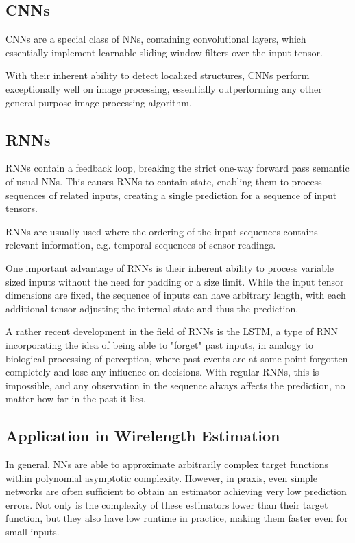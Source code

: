 \subsection{\glspl{CNN}}

\glspl{CNN} are a special class of \glspl{NN}, containing convolutional layers, which essentially implement learnable sliding-window filters over the input tensor. 

With their inherent ability to detect localized structures, \glspl{CNN} perform exceptionally well on image processing, essentially outperforming any other general-purpose image processing algorithm.\cite{TODO}

\subsection{\glspl{RNN}}

\glspl{RNN} contain a feedback loop, breaking the strict one-way forward pass semantic of usual \glspl{NN}. This causes \glspl{RNN} to contain state, enabling them to process sequences of related inputs, creating a single prediction for a sequence of input tensors.

\glspl{RNN} are usually used where the ordering of the input sequences contains relevant information, e.g. temporal sequences of sensor readings.

One important advantage of \glspl{RNN} is their inherent ability to process variable sized inputs without the need for padding or a size limit. While the input tensor dimensions are fixed, the sequence of inputs can have arbitrary length, with each additional tensor adjusting the internal state and thus the prediction.

A rather recent development in the field of \glspl{RNN} is the \gls{LSTM}\cite{TODO}, a type of \gls{RNN} incorporating the idea of being able to "forget" past inputs, in analogy to biological processing of perception, where past events are at some point forgotten completely and lose any influence on decisions. With regular \glspl{RNN}, this is impossible, and any observation in the sequence always affects the prediction, no matter how far in the past it lies.\cite{TODO}

\subsection{Application in Wirelength Estimation}

In general, \glspl{NN} are able to approximate arbitrarily complex target functions\cite{TODO} within polynomial asymptotic complexity\cite{NN-complexity-web}\cite{TODO}. However, in praxis, even simple networks are often sufficient to obtain an estimator achieving very low prediction errors. Not only is the complexity of these estimators lower than their target function, but they also have low runtime in practice, making them faster even for small inputs.

